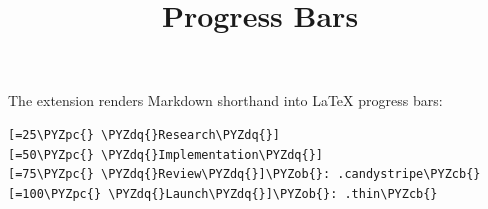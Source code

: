 \documentclass[a4paper,twoside]{article}
\title{Progress Bars}
\author{}\date{}
\begin{document}
\maketitle
The  extension renders Markdown shorthand into \LaTeX{} progress bars:
\begin{tscode}[lang=text, engine=pygments]
\begin{Verbatim}[commandchars=\\\{\},breaklines, breakanywhere, commandchars=\\\{\}]
[=25\PYZpc{} \PYZdq{}Research\PYZdq{}]
[=50\PYZpc{} \PYZdq{}Implementation\PYZdq{}]
[=75\PYZpc{} \PYZdq{}Review\PYZdq{}]\PYZob{}: .candystripe\PYZcb{}
[=100\PYZpc{} \PYZdq{}Launch\PYZdq{}]\PYZob{}: .thin\PYZcb{}
\end{Verbatim}
\end{tscode}
\end{document}
